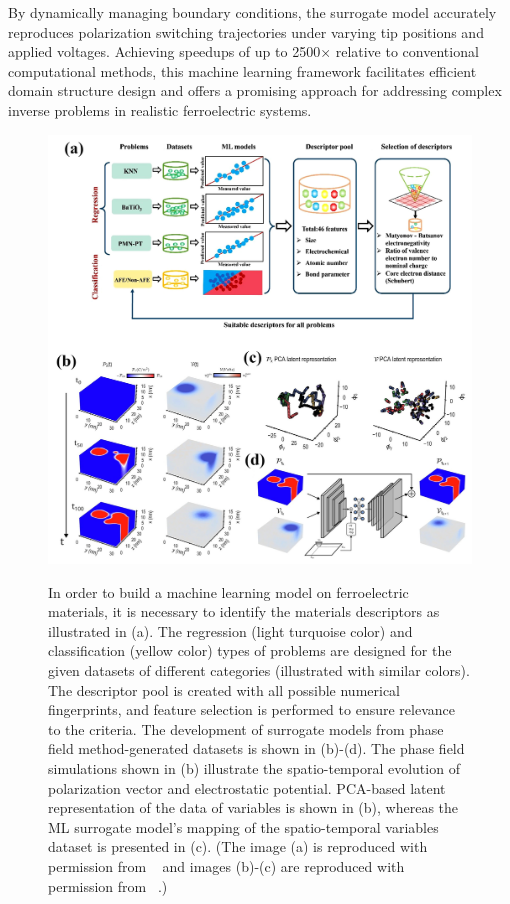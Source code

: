 \documentclass[a4paper,fleqn]{cas-sc}
\begin{document}
By dynamically managing boundary conditions, the surrogate model accurately reproduces polarization switching trajectories under varying tip positions and applied voltages. Achieving speedups of up to 2500× relative to conventional computational methods, this machine learning framework facilitates efficient domain structure design and offers a promising approach for addressing complex inverse problems in realistic ferroelectric systems.


\begin{figure} 
\centering
\includegraphics[scale = 0.125]{ml-figure1}\\
\caption{ In order to build a machine learning model on ferroelectric materials, it is necessary to identify the materials descriptors as illustrated in (a). The regression (light turquoise color)  and classification (yellow color) types of problems are designed for the given datasets of different categories (illustrated with similar colors). The descriptor pool is created with all possible numerical fingerprints, and feature selection is performed to ensure relevance to the criteria. The development of surrogate models from phase field method-generated datasets is shown in (b)-(d). The phase field simulations shown in (b) illustrate the spatio-temporal evolution of polarization vector and electrostatic potential. PCA-based latent representation of the data of variables is shown in (b), whereas the ML surrogate model's mapping of the spatio-temporal variables dataset is presented in (c). (The image (a) is reproduced with permission from ~\cite{HE2021116815} and images (b)-(c) are reproduced with permission from ~\cite{Alhada-Lahbabi2024}.)   }
\label{machine-learning-physics1}
\end{figure}%
\end{document}
